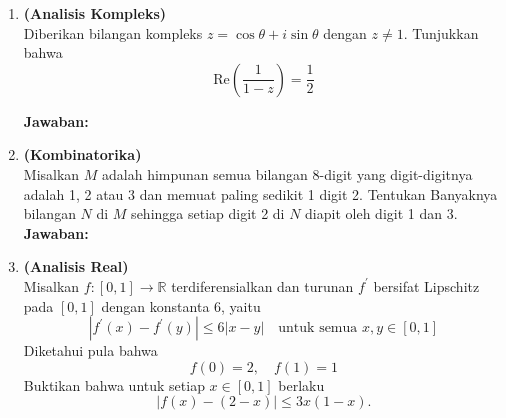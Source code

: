 \documentclass[12pt,a4paper]{article}
\begin{document}
\begin{enumerate}
        \textbf{Jawaban:}
        \par\vspace{0.1cm}\noindent
        \fbox{%
          \begin{minipage}[t][\dimexpr\textheight-\pagetotal-2.5cm\relax]{\dimexpr\linewidth-2\fboxsep-2\fboxrule\relax}
            \mbox{}
          \end{minipage}%
        }

        \newpage

  \item \textbf{(Analisis Kompleks)}\\
        Diberikan bilangan kompleks $z = \cos \theta + i \sin \theta$ dengan $z \ne 1$. Tunjukkan bahwa
        \[ \text{Re}\left(\frac{1}{1-z}\right) = \frac{1}{2} \]


        \textbf{Jawaban:}
        \par\vspace{0.1cm}\noindent
        \fbox{%
          \begin{minipage}[t][\dimexpr\textheight-\pagetotal-2.5cm\relax]{\dimexpr\linewidth-2\fboxsep-2\fboxrule\relax}
            \mbox{}
          \end{minipage}%
        }

        \newpage

  \item \textbf{(Kombinatorika)}\\
        Misalkan $M$ adalah himpunan semua bilangan 8-digit yang digit-digitnya adalah 1, 2 atau 3 dan memuat paling sedikit 1 digit 2. Tentukan Banyaknya bilangan $N$ di $M$ sehingga setiap digit 2 di $N$ diapit oleh digit 1 dan 3.\\


        \textbf{Jawaban:}
        \par\vspace{0.1cm}\noindent
        \fbox{%
          \begin{minipage}[t][\dimexpr\textheight-\pagetotal-2.5cm\relax]{\dimexpr\linewidth-2\fboxsep-2\fboxrule\relax}
            \mbox{}
          \end{minipage}%
        }

        \newpage

  \item \textbf{(Analisis Real)}\\
        Misalkan $f:[0,1] \rightarrow \mathbb{R}$ terdiferensialkan dan turunan $f^{\prime}$ bersifat Lipschitz pada $[0,1]$ dengan konstanta 6, yaitu
        \[ |f^{\prime}(x)-f^{\prime}(y)| \le 6|x-y| \quad \text{untuk semua } x, y \in [0,1] \]
        Diketahui pula bahwa
        \[ f(0)=2, \quad f(1)=1 \]
        Buktikan bahwa untuk setiap $x \in [0,1]$ berlaku
        \[ |f(x)-(2-x)| \le 3x(1-x). \]



\end{enumerate}
\end{document}
